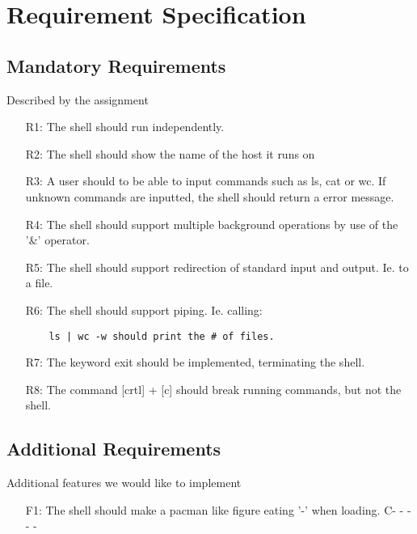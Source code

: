 \chapter{Requirement Specification}
\section{Mandatory Requirements}
Described by the assignment
\begin{itemize}[leftmargin=25mm]
\item[R1:] The shell should run independently.
\item[R2:] The shell should show the name of the host it runs on
\item[R3:] A user should to be able to input commands such as ls, cat or wc. If unknown commands are inputted, the shell should return a error message.
\item[R4:] The shell should support multiple background operations by use of the '\&' operator.
\item[R5:] The shell should support redirection of standard input and output. Ie. to a file.
\item[R6:] The shell should support piping. Ie. calling: \begin{verbatim}
	ls | wc -w should print the # of files.
\end{verbatim}
\item[R7:] The keyword exit should be implemented, terminating the shell.
\item[R8:] The command [crtl] + [c] should break running commands, but not the shell.
\end{itemize}
\section{Additional Requirements}
Additional features we would like to implement
\begin{itemize}[leftmargin=25mm]
\item[F1:] The shell should make a pacman like figure eating '-' when loading.
 C- - - - -
\end{itemize}